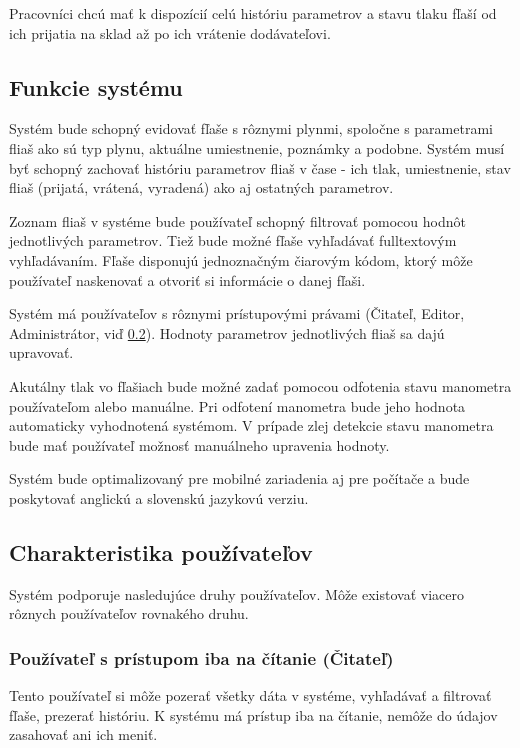 \documentclass{zah}
\begin{document}
Pracovníci chcú mať k dispozícií celú históriu parametrov a stavu tlaku fľaší od ich prijatia na sklad až po ich vrátenie dodávateľovi.

\subsection{Funkcie systému}
\label{gen:functions}
Systém bude schopný evidovať fľaše s rôznymi plynmi, spoločne s parametrami fliaš ako sú typ plynu, aktuálne umiestnenie, poznámky a podobne. Systém musí byť schopný zachovať históriu parametrov fliaš v čase - ich tlak, umiestnenie, stav fliaš (prijatá, vrátená, vyradená) ako aj ostatných parametrov.

Zoznam fliaš v systéme bude používateľ schopný filtrovať pomocou hodnôt jednotlivých parametrov. Tiež bude možné fľaše vyhľadávať fulltextovým vyhľadávaním. Fľaše disponujú jednoznačným čiarovým kódom, ktorý môže používateľ naskenovať a otvoriť si informácie o danej fľaši.

Systém má používateľov s rôznymi prístupovými právami (Čitateľ, Editor, Administrátor, viď \ref{gen:users}). Hodnoty parametrov jednotlivých fliaš sa dajú upravovať.

Akutálny tlak vo fľašiach bude možné zadať pomocou odfotenia stavu manometra používateľom alebo manuálne. Pri odfotení manometra bude jeho hodnota automaticky vyhodnotená systémom. V prípade zlej detekcie stavu manometra bude mať používateľ možnosť manuálneho upravenia hodnoty.

Systém bude optimalizovaný pre mobilné zariadenia aj pre počítače a bude poskytovať anglickú a slovenskú jazykovú verziu.

\subsection{Charakteristika používateľov}
\label{gen:users}

Systém podporuje nasledujúce druhy používateľov. Môže existovať viacero rôznych používateľov rovnakého druhu.

\subsubsection{Používateľ s prístupom iba na čítanie (Čitateľ)}
\label{gen:users:ro}

Tento používateľ si môže pozerať všetky dáta v systéme, vyhľadávať a filtrovať fľaše, prezerať históriu. K systému má prístup iba na čítanie, nemôže do údajov zasahovať ani ich meniť.
\end{document}
